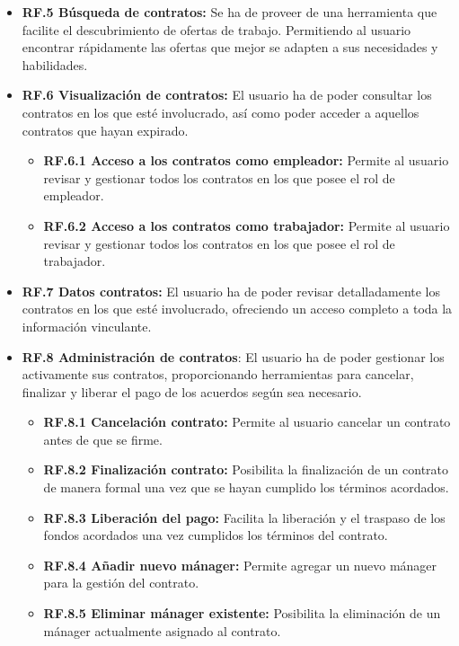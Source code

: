 \begin{itemize}
\item \textbf{RF.5 Búsqueda de contratos:} Se ha de proveer de una herramienta que facilite el descubrimiento de ofertas de trabajo. Permitiendo al usuario encontrar rápidamente las ofertas que mejor se adapten a sus necesidades y habilidades. 
	
\item \textbf{RF.6 Visualización de contratos:} El usuario ha de poder consultar los contratos en los que esté involucrado, así como poder acceder a aquellos contratos que hayan expirado.
	\begin{itemize}
	\item \textbf{RF.6.1 Acceso a los contratos como empleador:} Permite al usuario revisar y gestionar		 	todos los contratos en los que posee el rol de empleador.
	\item \textbf{RF.6.2 Acceso a los contratos como trabajador:} Permite al usuario revisar y gestionar		 	todos los contratos en los que posee el rol de trabajador.
	\end{itemize}
	
\item \textbf{RF.7 Datos contratos:} El usuario ha de poder revisar detalladamente los contratos en los que esté involucrado, ofreciendo un acceso completo a toda la información vinculante.
	
\item \textbf{RF.8 Administración de contratos}: El usuario ha de poder gestionar los activamente sus contratos, proporcionando herramientas para cancelar, finalizar y liberar el pago de los acuerdos según sea necesario.
	\begin{itemize}
	\item \textbf{RF.8.1 Cancelación contrato:} Permite al usuario cancelar un contrato antes de que	 	se firme.
	\item \textbf{RF.8.2 Finalización contrato:} Posibilita la finalización de un contrato de manera		formal una vez que se hayan cumplido los términos acordados.
	\item \textbf{RF.8.3 Liberación del pago:} Facilita la liberación y el traspaso de los fondos			acordados una vez cumplidos los términos del contrato.
	\item \textbf{RF.8.4 Añadir nuevo mánager:} Permite agregar un nuevo mánager para la gestión del		contrato.
	\item \textbf{RF.8.5 Eliminar mánager existente:} Posibilita la eliminación de un mánager
	actualmente asignado al contrato.
	\end{itemize}
	

\end{itemize}
